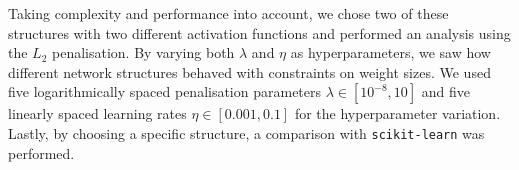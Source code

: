     Taking complexity and performance into account, we chose two of these structures with two different activation functions and performed an analysis using the $L_2$ penalisation. By varying both $\lambda$ and $\eta$ as hyperparameters, we saw how different network structures behaved with constraints on weight sizes. We used five logarithmically spaced penalisation parameters $\lambda \in [10^{-8}, 10]$ and five linearly spaced learning rates $\eta \in [0.001, 0.1]$ for the hyperparameter variation.  Lastly, by choosing a specific structure, a comparison with \verb|scikit-learn| was performed.